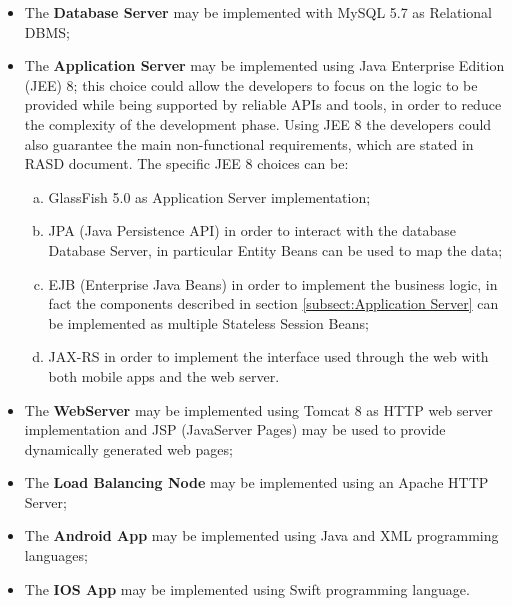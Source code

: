 \begin{itemize}
	\item The \textbf{Database Server} may be implemented with MySQL 5.7 as Relational DBMS;
	
	\item The \textbf{Application Server} may be implemented using Java Enterprise Edition (JEE) 8; this choice could allow the developers to focus on the logic to be provided while being supported by reliable APIs and tools, in order to reduce the complexity of the development phase. Using JEE 8 the developers could also guarantee the main non-functional requirements, which are stated in RASD document. The specific JEE 8 choices can be:
	\begin{enumerate}[a)]
		\item GlassFish 5.0 as Application Server implementation;
		\item JPA (Java Persistence API) in order to interact with the database Database Server, in particular Entity Beans can be used to map the data;
		\item EJB (Enterprise Java Beans) in order to implement the business logic, in fact the components described in section \ref{subsect:Application Server} can be implemented as multiple Stateless Session Beans;
		\item JAX-RS in order to implement the interface used through the web with both mobile apps and the web server.
	\end{enumerate}
	
	\item The \textbf{WebServer} may be implemented using Tomcat 8 as HTTP web server implementation and JSP (JavaServer Pages) may be used to provide dynamically generated web pages;
	
	\item The \textbf{Load Balancing Node} may be implemented using an Apache HTTP Server;
	
	\item The \textbf{Android App} may be implemented using Java and XML programming languages;
	
	\item The \textbf{IOS App} may be implemented using Swift programming language.
\end{itemize}
\newpage